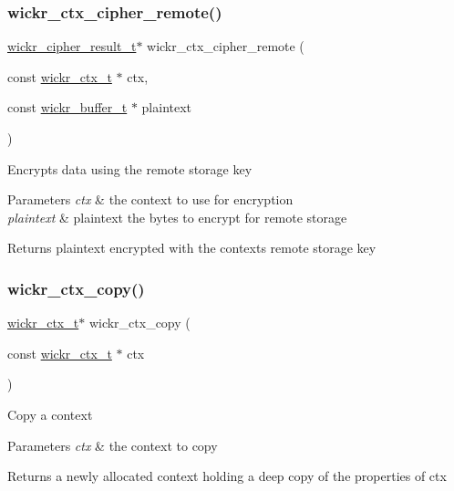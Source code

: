 \subsubsection{\texorpdfstring{wickr\+\_\+ctx\+\_\+cipher\+\_\+remote()}{wickr\_ctx\_cipher\_remote()}}
{\footnotesize\ttfamily \hyperlink{structwickr__cipher__result}{wickr\+\_\+cipher\+\_\+result\+\_\+t}$\ast$ wickr\+\_\+ctx\+\_\+cipher\+\_\+remote (\begin{DoxyParamCaption}\item[{const \hyperlink{structwickr__ctx}{wickr\+\_\+ctx\+\_\+t} $\ast$}]{ctx,  }\item[{const \hyperlink{structwickr__buffer}{wickr\+\_\+buffer\+\_\+t} $\ast$}]{plaintext }\end{DoxyParamCaption})}

Encrypts data using the remote storage key


\begin{DoxyParams}{Parameters}
{\em ctx} & the context to use for encryption \\
\hline
{\em plaintext} & plaintext the bytes to encrypt for remote storage \\
\hline
\end{DoxyParams}
\begin{DoxyReturn}{Returns}
\textquotesingle{}plaintext\textquotesingle{} encrypted with the context\textquotesingle{}s remote storage key 
\end{DoxyReturn}
\mbox{\label{group__wickr__ctx_gaaa74a32619fb3b382fbeeeddc425a910}} 
\subsubsection{\texorpdfstring{wickr\+\_\+ctx\+\_\+copy()}{wickr\_ctx\_copy()}}
{\footnotesize\ttfamily \hyperlink{structwickr__ctx}{wickr\+\_\+ctx\+\_\+t}$\ast$ wickr\+\_\+ctx\+\_\+copy (\begin{DoxyParamCaption}\item[{const \hyperlink{structwickr__ctx}{wickr\+\_\+ctx\+\_\+t} $\ast$}]{ctx }\end{DoxyParamCaption})}

Copy a context


\begin{DoxyParams}{Parameters}
{\em ctx} & the context to copy \\
\hline
\end{DoxyParams}
\begin{DoxyReturn}{Returns}
a newly allocated context holding a deep copy of the properties of \textquotesingle{}ctx\textquotesingle{} 
\end{DoxyReturn}
\mbox{\label{group__wickr__ctx_ga085975d71519bf5729a7cf264a5f7876}} 
